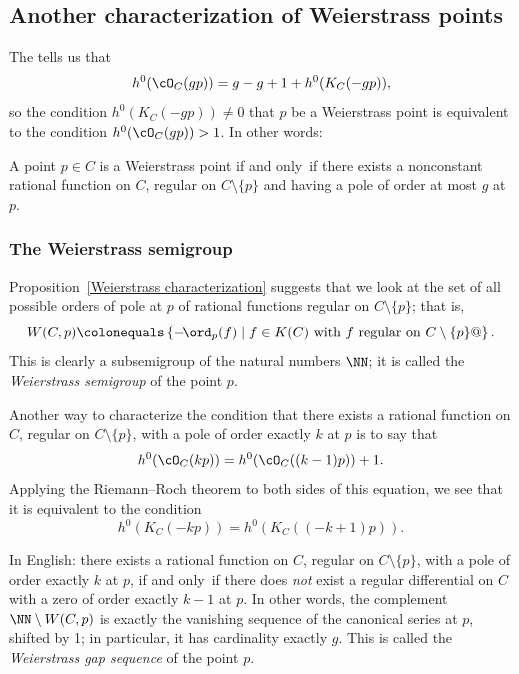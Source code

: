 \subsection*{Another characterization of Weierstrass points}

The 
%
tells us that
$$
h^0(\cO_C(gp)) = g - g + 1 + h^0(K_C(-gp))
,
$$
so the condition $h^0(K_C(-gp)) \neq 0$ that $p$ be a Weierstrass point is
equivalent to the condition $h^0(\cO_C(gp)) > 1$. In other words:

\begin{proposition}\label{Weierstrass characterization}
A point $p \in C$ is a Weierstrass point if and only~if there exists
a nonconstant rational function on $C$, regular on $C \setminus \{p\}$
and having a pole of order at most $g$ at $p$.
\unif
\end{proposition}

\subsubsection*{The Weierstrass semigroup}

Proposition~\ref{Weierstrass characterization} suggests that we look
at the set of all possible orders of pole at $p$ of rational functions
regular on $C \setminus \{p\}$; that is,
$$
W(C,p) \colonequals  \left\{ -\! %
\ord_p(f) \mid f \in K(C) \text{ with $f$
regular on } C \setminus \{p\} @\right\}.
$$
This is clearly a subsemigroup of the natural numbers $\NN$; it is
%
called the \emph{Weierstrass semigroup} of the point $p$.

Another way to characterize the condition that there exists a rational
function on $C$, regular on $C \setminus \{p\}$, with a pole of order
exactly $k$ at $p$ is to say that
$$
h^0(\cO_C(kp)) = h^0(\cO_C((k-1)p)) + 1.
$$
Applying
the Riemann--Roch theorem
%
to both sides of this equation, we see that it is equivalent to the
condition
$$
h^0(K_C(-kp)) = h^0(K_C((-k+1)p)).
$$

In English: there exists a rational function on $C$, regular on $C
\setminus \{p\}$, with a pole of order exactly $k$ at $p$, if and only~if
there does \emph{not} exist a regular differential on $C$ with a zero
of order exactly $k-1$ at $p$.
In other words, the complement $\NN \setminus W(C,p)$ is exactly
the vanishing sequence of the canonical series at $p$, shifted by 1;
in particular, it has cardinality  exactly $g$. This is called the
%
\emph{Weierstrass gap sequence} of the point $p$.

